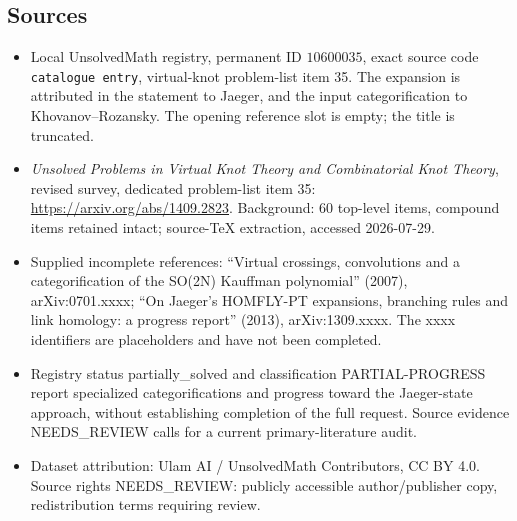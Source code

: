 \documentclass[11pt]{article}
\begin{document}
\subsection{Sources}
\begin{itemize}
\item Local UnsolvedMath registry, permanent ID \(10600035\), exact source code \texttt{catalogue entry}, virtual-knot problem-list item 35. The expansion is attributed in the statement to Jaeger, and the input categorification to Khovanov--Rozansky. The opening reference slot is empty; the title is truncated.
\item \emph{Unsolved Problems in Virtual Knot Theory and Combinatorial Knot Theory}, revised survey, dedicated problem-list item 35: \url{https://arxiv.org/abs/1409.2823}. Background: 60 top-level items, compound items retained intact; source-TeX extraction, accessed 2026-07-29.
\item Supplied incomplete references: ``Virtual crossings, convolutions and a categorification of the SO(2N) Kauffman polynomial'' (2007), arXiv:0701.xxxx; ``On Jaeger's HOMFLY-PT expansions, branching rules and link homology: a progress report'' (2013), arXiv:1309.xxxx. The xxxx identifiers are placeholders and have not been completed.
\item Registry status partially\_solved and classification PARTIAL-PROGRESS report specialized categorifications and progress toward the Jaeger-state approach, without establishing completion of the full request. Source evidence NEEDS\_REVIEW calls for a current primary-literature audit.
\item Dataset attribution: Ulam AI / UnsolvedMath Contributors, CC BY 4.0. Source rights NEEDS\_REVIEW: publicly accessible author/publisher copy, redistribution terms requiring review.
\end{itemize}
\end{document}
